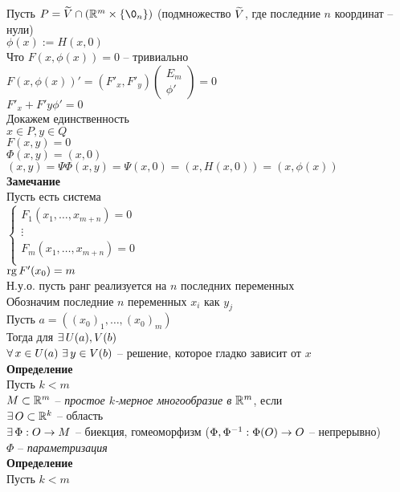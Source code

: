 \documentclass[12pt]{article}
\begin{document}
Пусть $P = \ot V \cap (\Rset^m \times \{\0_n\})$ (подмножество $\widetilde V$, где последние $n$ координат -- нули)\\
$\phi(x):= H(x,0)$\\
Что $F(x, \phi(x)) = 0$ -- тривиально\\
$F(x, \phi(x))' = (F'_x, F'_y) \begin{pmatrix}
    E_m\\\phi'
\end{pmatrix} = 0$\\
$F'_x + F'y\phi' = 0$\\
Докажем единственность\\
$x \in P, y \in Q$\\
$F(x,y) = 0$\\
$\Phi(x,y) = (x,0)$\\
$(x,y) = \Psi\Phi(x,y) = \Psi(x,0) = (x, H(x,0)) = (x, \phi(x))$\\
\textbf{Замечание}\\
Пусть есть система\\
$\left\{\begin{array}{l}
    F_1(x_1, \ldots, x_{m+n}) = 0\\
    \vdots\\
    F_m(x_1, \ldots, x_{m+n}) = 0\\
\end{array}\right.$\\
$\operatorname{rg} F'(x_0) = m$\\
Н.у.о. пусть ранг реализуется на $n$ последних переменных\\
Обозначим последние $n$ переменных $x_i$ как $y_{j}$\\
Пусть $a = ((x_0)_1, \ldots, (x_0)_m)$\\
Тогда для $\exists\, U(a), V(b)$\\
$\forall\, x \in U(a)\ \exists\, y\in V(b)$ -- решение, которое гладко зависит от $x$\\
\textbf{Определение}\\
Пусть $k < m$\\
$M \subset \mathbb{R}^m$ -- \textit{простое $k$-мерное многообразие в $\mathbb{R}^m$}, если\\
$\exists\, O \subset \mathbb{R}^k$ -- область\\
$\exists\, \Phi: O \rightarrow M$ -- биекция, гомеоморфизм ($\Phi, \Phi^{-1}: \Phi(O)\rightarrow O$ -- непрерывно)\\
$\Phi$ -- \textit{параметризация}\\
\textbf{Определение}\\
Пусть $k < m$\\
\end{document}
